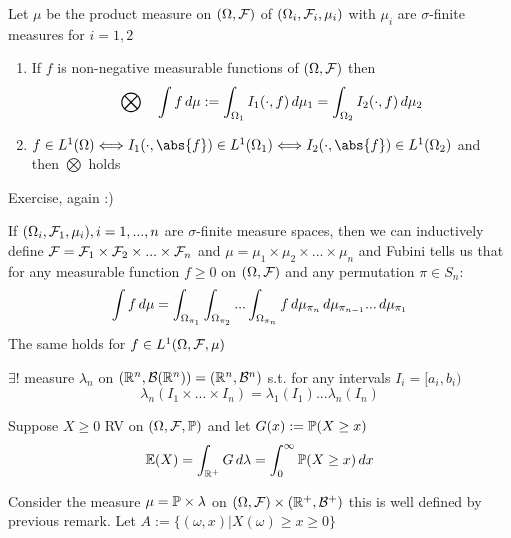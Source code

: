 \begin{thm}
\label{Fubini}
Let $\mu$ be the product measure on $(\Omega, \mathcal{F})$ of $(\Omega_i, \mathcal{F}_i, \mu_i)$ with $\mu_i$ are $\sigma$-finite measures for $i=1,2$
\begin{enumerate}
    \item If $f$ is non-negative measurable functions of $(\Omega, \mathcal{F})$ then 
    \begin{equation*}
        \bigotimes \quad \int f \mathop{}\!d\mu := \int_{\Omega_1} I_1(\cdot, f) \mathop{}\!d \mu_1 = \int_{\Omega_2} I_2(\cdot, f) \mathop{}\!d \mu_2 
    \end{equation*}
    \item $f\in \ls{1}(\Omega)\Longleftrightarrow I_1(\cdot, \abs{f})\in \ls{1}(\Omega_1) \Longleftrightarrow I_2(\cdot, \abs{f})\in \ls{1}(\Omega_2)$ and then $\bigotimes$ holds
\end{enumerate}
\end{thm}
\pf  Exercise, again :)
\begin{rem}
If $(\Omega_i, \mathcal{F}_1, \mu_i), i=1,...,n$ are $\sigma$-finite measure spaces, then we can inductively define $\mathcal{F} = \mathcal{F}_1 \times \mathcal{F}_2 \times ... \times \mathcal{F}_n$ and $\mu =\mu_1 \times \mu_2 \times ... \times \mu_n $ and Fubini tells us that for any measurable function $f\geq 0$ on $(\Omega, \mathcal{F})$ and any permutation $\pi \in S_n$:
\begin{equation*}
    \int f\mathop{}\!d\mu = \int_{\Omega_{\pi_1}}\int_{\Omega_{\pi_2}} ... \int_{\Omega_{\pi_n}} f \mathop{}\!d\mu_{\pi_n} \mathop{}\!d\mu_{\pi_{n-1}} ... \mathop{}\!d\mu_{\pi_1}
\end{equation*}The same holds for $f\in L^{1}(\Omega, \mathcal{F}, \mu)$
\end{rem}
\begin{cor}$\exists!$ measure $\lambda_n$ on $(\mathbb{R}^n, \mathcal{B}(\mathbb{R}^n)) = (\mathbb{R}^n, \mathcal{B}^n)$ s.t. for any intervals $I_i = [a_i, b_i)$
\begin{equation*}
    \lambda_n (I_1 \times ... \times I_n) = \lambda_1(I_1) ... \lambda_n(I_n)
\end{equation*}
\end{cor}
\newpage
\begin{prop}Suppose $X \geq 0$ RV on $(\Omega, \mathcal{F}, \mathbb{P})$ and let $G(x) := \mathbb{P}(X\geq x)$ 
\begin{equation*}
    \mathbb{E}(X) = \int_{\mathbb{R}^+} G \mathop{}\!d\lambda = \int_0^\infty \mathbb{P}(X\geq x) \mathop{}\!d x
\end{equation*}
\end{prop}
\pf Consider the measure $\mu = \mathbb{P} \times \lambda$ on $(\Omega, \mathcal{F}) \times (\mathbb{R}^+, \mathcal{B}^+)$ this is well defined by previous remark. Let $A := \{(\omega, x)| X(\omega) \geq x \geq 0\}$ \\

